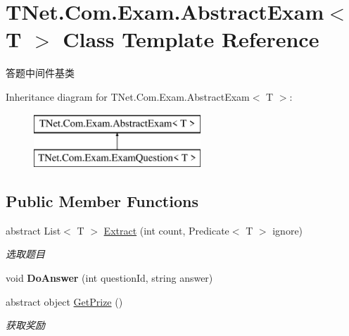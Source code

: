 \hypertarget{class_t_net_1_1_com_1_1_exam_1_1_abstract_exam}{}\section{T\+Net.\+Com.\+Exam.\+Abstract\+Exam$<$ T $>$ Class Template Reference}
\label{class_t_net_1_1_com_1_1_exam_1_1_abstract_exam}


答题中间件基类  


Inheritance diagram for T\+Net.\+Com.\+Exam.\+Abstract\+Exam$<$ T $>$\+:\begin{figure}[H]
\begin{center}
\leavevmode
\includegraphics[height=2.000000cm]{class_t_net_1_1_com_1_1_exam_1_1_abstract_exam}
\end{center}
\end{figure}
\subsection*{Public Member Functions}
\begin{DoxyCompactItemize}
\item 
abstract List$<$ T $>$ \mbox{\hyperlink{class_t_net_1_1_com_1_1_exam_1_1_abstract_exam_a5c9f0c8798f5666caf68476f53d6d039}{Extract}} (int count, Predicate$<$ T $>$ ignore)
\begin{DoxyCompactList}\small\item\em 选取题目 \end{DoxyCompactList}\item 
\mbox{\label{class_t_net_1_1_com_1_1_exam_1_1_abstract_exam_a41cb0db1fede2a6522f57cdec4a21985}} 
void {\bfseries Do\+Answer} (int question\+Id, string answer)
\item 
abstract object \mbox{\hyperlink{class_t_net_1_1_com_1_1_exam_1_1_abstract_exam_a51cd6f2f27ff58d597d666a17d73c0fd}{Get\+Prize}} ()
\begin{DoxyCompactList}\small\item\em 获取奖励 \end{DoxyCompactList}\end{DoxyCompactItemize}
